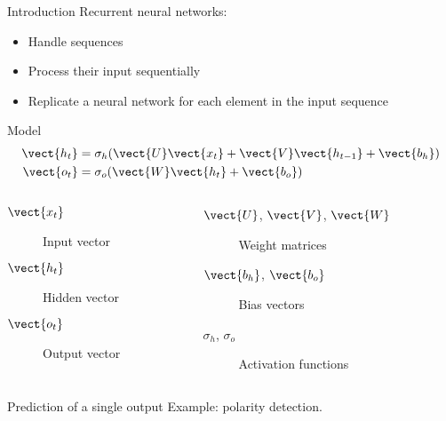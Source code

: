 \begin{frame}{Introduction}
  Recurrent neural networks:

  \begin{itemize}[<+(1)->]
    \item Handle sequences
    \item Process their input sequentially
    \item Replicate a neural network for each element in the input sequence
  \end{itemize}
\end{frame}

\begin{frame}{Model}
  \begin{align*}
    \vect{h_t} &= \sigma_h(\vect{U} \vect{x_t} + \vect{V} \vect{h_{t-1}} + \vect{b_h}) \\
    \vect{o_t} &= \sigma_o(\vect{W} \vect{h_t} + \vect{b_o})
  \end{align*}
  \begin{columns}
    \begin{column}{.5\textwidth}
      \begin{description}
        \item[$\vect{x_t}$] Input vector
        \item[$\vect{h_t}$] Hidden vector
        \item[$\vect{o_t}$] Output vector
        \end{description}
    \end{column}
    \begin{column}{.5\textwidth}
      \begin{description}
        \item[$\vect{U}$, $\vect{V}$, $\vect{W}$] Weight matrices
        \item[$\vect{b_h}$, $\vect{b_o}$] Bias vectors
        \item[$\sigma_h$, $\sigma_o$] Activation functions
        \end{description}
    \end{column}
  \end{columns}
\end{frame}

\begin{frame}{Prediction of a single output}
  Example: polarity detection.

  \begin{figure}
    \centering
  \end{figure}
\end{frame}

